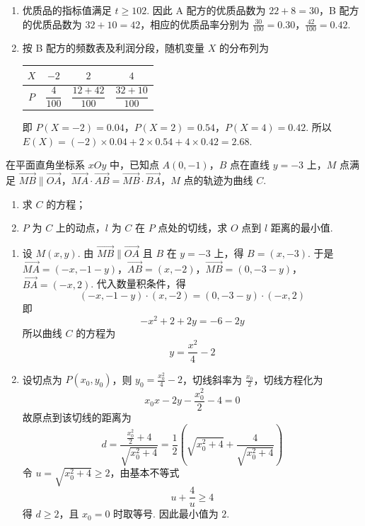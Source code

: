 \begin{solution}
\begin{enumerate}
\item 优质品的指标值满足 \(t\geqslant102\). 因此 A 配方的优质品数为 \(22+8=30\)，B 配方的优质品数为 \(32+10=42\)，相应的优质品率分别为 \(\frac{30}{100}=0.30\)，\(\frac{42}{100}=0.42\).
\item 按 B 配方的频数表及利润分段，随机变量 \(X\) 的分布列为
\begin{center}
\begin{tabular}{c|c|c|c}
\hline
\(X\) & \(-2\) & \(2\) & \(4\)\\
\hline
\(P\) & \(\dfrac4{100}\) & \(\dfrac{12+42}{100}\) & \(\dfrac{32+10}{100}\)\\
\hline
\end{tabular}
\end{center}
即 \(P(X=-2)=0.04\)，\(P(X=2)=0.54\)，\(P(X=4)=0.42\).
所以 \(E(X)=(-2)\times0.04+2\times0.54+4\times0.42=2.68\).
\end{enumerate}
\end{solution}

\begin{problem}
在平面直角坐标系 \(xOy\) 中，已知点 \(A\left(0, -1\right)\)，\(B\) 点在直线 \(y = -3\) 上，\(M\) 点满足 \(\overrightarrow{MB} \parallel \overrightarrow{OA}\)，\(\overrightarrow{MA} \cdot \overrightarrow{AB} = \overrightarrow{MB} \cdot \overrightarrow{BA}\)，\(M\) 点的轨迹为曲线 \(C\).
\begin{enumerate}
\item 求 \(C\) 的方程；
\item \(P\) 为 \(C\) 上的动点，\(l\) 为 \(C\) 在 \(P\) 点处的切线，求 \(O\) 点到 \(l\) 距离的最小值.
\end{enumerate}
\end{problem}

\begin{solution}
\begin{enumerate}
\item 设 \(M(x,y)\). 由 \(\overrightarrow{MB}\parallel\overrightarrow{OA}\) 且 \(B\) 在 \(y=-3\) 上，得 \(B=(x,-3)\). 于是 \(\overrightarrow{MA}=(-x,-1-y)\)，\(\overrightarrow{AB}=(x,-2)\)，\(\overrightarrow{MB}=(0,-3-y)\)，\(\overrightarrow{BA}=(-x,2)\).
代入数量积条件，得
\[
(-x,-1-y)\cdot(x,-2)=(0,-3-y)\cdot(-x,2)
\]
即
\[
-x^{2}+2+2y=-6-2y
\]
所以曲线 \(C\) 的方程为
\[
y=\frac{x^{2}}4-2
\]
\item 设切点为 \(P(x_{0},y_{0})\)，则 \(y_{0}=\frac{x_{0}^{2}}{4}-2\)，切线斜率为 \(\frac{x_{0}}{2}\)，切线方程化为
\[
x_{0}x-2y-\frac{x_{0}^{2}}2-4=0
\]
故原点到该切线的距离为
\[
d=\frac{\frac{x_{0}^{2}}2+4}{\sqrt{x_{0}^{2}+4}}
=\frac12\left(\sqrt{x_{0}^{2}+4}+\frac4{\sqrt{x_{0}^{2}+4}}\right)
\]
令 \(u=\sqrt{x_{0}^{2}+4}\geqslant2\)，由基本不等式
\[
u+\frac4u\geqslant4
\]
得 \(d\geqslant2\)，且 \(x_{0}=0\) 时取等号. 因此最小值为 \(2\).
\end{enumerate}
\end{solution}

